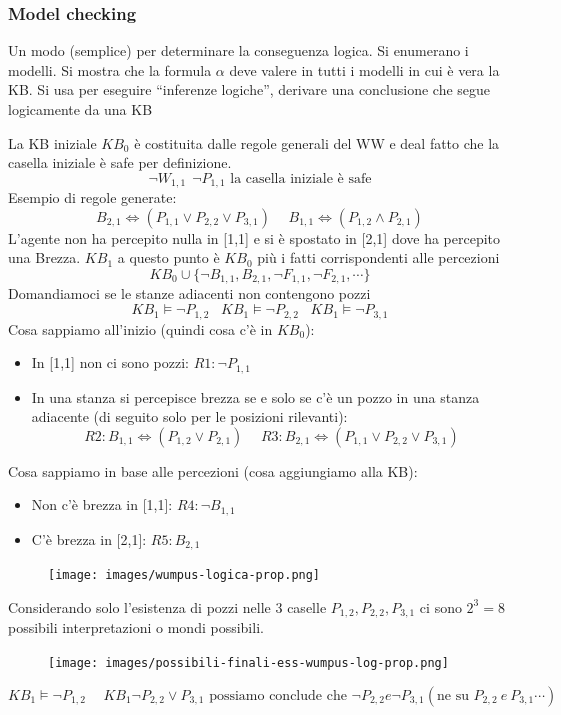 \subsubsection{Model checking}
Un modo (semplice) per determinare la conseguenza logica. Si enumerano i modelli. 
Si mostra che la formula $\alpha$ deve valere in tutti i modelli in cui è vera la KB.
Si usa per eseguire “inferenze logiche”, derivare una conclusione che segue logicamente da una KB
\begin{example}
    La KB iniziale $KB_0$ è costituita dalle regole generali del WW e deal fatto che la casella iniziale è safe per definizione.
    $$\lnot W_{1,1} \:\: \lnot P_{1,1} \text{ la casella iniziale è safe}$$
    Esempio di regole generate: 
    $$B_{2,1} \Leftrightarrow (P_{1,1} \lor P_{2,2} \lor P_{3,1}) \hspace{15pt} B_{1,1} \Leftrightarrow (P_{1,2} \land P_{2,1})$$
    L’agente non ha percepito nulla in [1,1] e si è spostato in [2,1] dove ha percepito una Brezza. $KB_1$ a questo punto è $KB_0$
    più i fatti corrispondenti alle percezioni $$KB_0 \cup \{\lnot B_{1,1}, B_{2,1}, \lnot F_{1,1}, \lnot F_{2,1}, \cdots\}$$
    Domandiamoci se le stanze adiacenti non contengono pozzi
    $$KB_1 \models \lnot P_{1,2} \hspace{10pt} KB_1 \models \lnot P_{2,2} \hspace{10pt} KB_1 \models \lnot P_{3,1}$$
    Cosa sappiamo all'inizio (quindi cosa c'è in $KB_0$):
    \begin{itemize}
        \item In [1,1] non ci sono pozzi: $R1: \lnot P_{1,1}$
        \item In una stanza si percepisce brezza se e solo se c’è un pozzo in una stanza adiacente (di seguito solo per le posizioni rilevanti):
        $$R2: B_{1,1} \Leftrightarrow (P_{1,2} \lor P_{2,1}) \hspace{15pt} R3: B_{2,1} \Leftrightarrow (P_{1,1} \lor P_{2,2} \lor P_{3,1})$$
    \end{itemize}
    Cosa sappiamo in base alle percezioni (cosa aggiungiamo alla KB):
    \begin{itemize}
        \item Non c'è brezza in [1,1]: $R4: \lnot B_{1,1}$
        \item C'è brezza in [2,1]: $R5: B_{2,1}$
    \end{itemize}
    \begin{figure}[h!]
        \centering
        \texttt{[image: images/wumpus-logica-prop.png]}
    \end{figure}
    Considerando solo l’esistenza di pozzi nelle 3 caselle $P_{1,2}, P_{2,2}, P_{3,1}$ ci sono
    $2^3 = 8$ possibili interpretazioni o mondi possibili.
    \begin{figure}[h!]
        \centering
        \texttt{[image: images/possibili-finali-ess-wumpus-log-prop.png]}
    \end{figure}
    $$KB_1 \models \lnot P_{1,2} \hspace{15pt} KB_1 \lnot P_{2,2} \lor P_{3,1} \text{ possiamo conclude che } \lnot P_{2,2} e \lnot P_{3,1} (\text{ne su }P_{2,2} \:e\: P_{3,1} \cdots)$$
\end{example}
